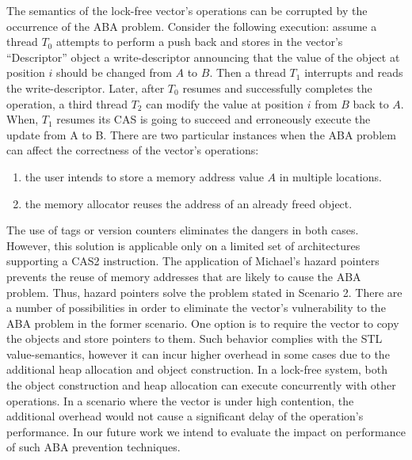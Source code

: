 The semantics of the lock-free vector's operations can be corrupted by
the occurrence of the ABA problem. Consider the following execution:
assume a thread $T_0$ attempts to perform a push back and stores in
the vector's ``Descriptor'' object a write-descriptor announcing that
the value of the object at position $i$ should be changed from $A$ to
$B$. Then a thread $T_1$ interrupts and reads the
write-descriptor. Later, after $T_0$ resumes and successfully
completes the operation, a third thread $T_2$ can modify the value at
position $i$ from $B$ back to $A$. When, $T_1$ resumes its CAS is
going to succeed and erroneously execute the update from A to B. There
are two particular instances when the ABA problem can affect the
correctness of the vector's operations:

\begin{enumerate}
\item the user intends to store a memory address value $A$ in multiple
  locations.
\item the memory allocator reuses the address of an already freed
  object.
\end{enumerate}

The use of tags or version counters eliminates the dangers in both
cases. However, this solution is applicable only on a limited set of
architectures supporting a CAS2 instruction. The application of
Michael's hazard pointers prevents the reuse of memory addresses that
are likely to cause the ABA problem. Thus, hazard pointers solve the
problem stated in Scenario 2. There are a number of possibilities in
order to eliminate the vector's vulnerability to the ABA problem in
the former scenario. One option is to require the vector to copy the
objects and store pointers to them. Such behavior complies with the
STL value-semantics, however it can incur higher overhead in some
cases due to the additional heap allocation and object
construction. In a lock-free system, both the object construction and
heap allocation can execute concurrently with other operations. In a
scenario where the vector is under high contention, the additional
overhead would not cause a significant delay of the operation's
performance. In our future work we intend to evaluate the impact on
performance of such ABA prevention techniques.


